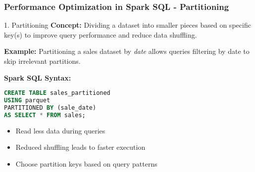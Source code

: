 \documentclass[aspectratio=169]{beamer}
\begin{document}
\begin{frame}[fragile]
    \frametitle{Performance Optimization in Spark SQL - Partitioning}
    \begin{block}{1. Partitioning}
        \textbf{Concept:} Dividing a dataset into smaller pieces based on specific key(s) to improve query performance and reduce data shuffling.
        
        \textbf{Example:} Partitioning a sales dataset by \textit{date} allows queries filtering by date to skip irrelevant partitions.
        
        \textbf{Spark SQL Syntax:}
        \begin{lstlisting}[language=SQL]
CREATE TABLE sales_partitioned
USING parquet
PARTITIONED BY (sale_date)
AS SELECT * FROM sales;
        \end{lstlisting}
    \end{block}
    \begin{itemize}
        \item Read less data during queries
        \item Reduced shuffling leads to faster execution
        \item Choose partition keys based on query patterns
    \end{itemize}
\end{frame}
\end{document}
